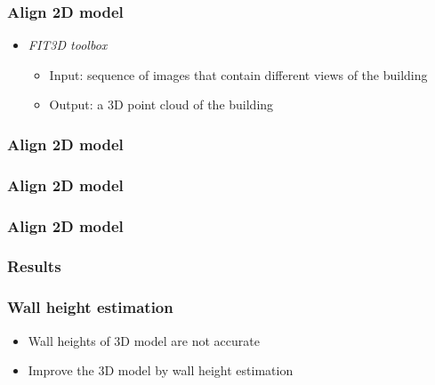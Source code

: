 \documentclass{beamer}
\begin{document}
\frame
{
	\frametitle{Align 2D model}
	\begin{itemize}
	\item <+-| alert@+> \emph{FIT3D toolbox}
		\begin{itemize}
		\item <+-| alert@+> Input: sequence of images that contain different views of the building
		\item <+-| alert@+> Output: a 3D point cloud of the building
		\end{itemize}
	\end{itemize}
}

\frame
{
}



\frame
{
	\frametitle{Align 2D model}
}


\frame
{
	\frametitle{Align 2D model}
}


\frame
{
	\frametitle{Align 2D model}
}

\frame
{
	\frametitle{Results}
}

\frame
{
	\frametitle{Wall height estimation}
	\begin{itemize}
	\item <+-| alert@+> Wall heights of 3D model are not accurate
	\item <+-| alert@+> Improve the 3D model by wall height estimation
	\end{itemize}
}
\end{document}
